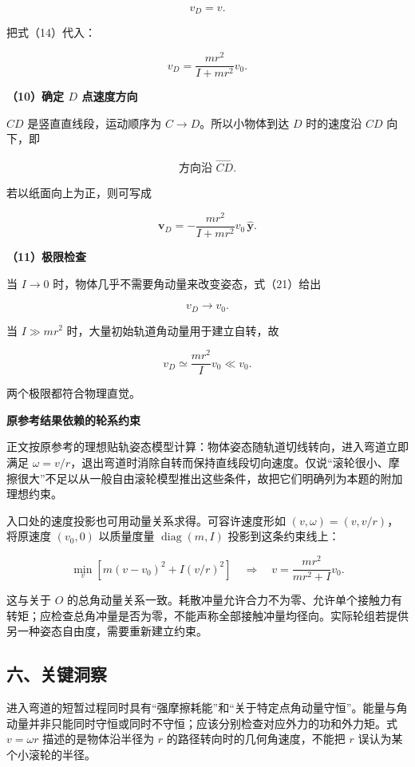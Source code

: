 \documentclass[12pt,a4paper,UTF8]{ctexart}
\begin{document}
\[
v_D=v.
\tag{20}
\]

把式（14）代入：

\[
\boxed{
v_D=\frac{mr^2}{I+mr^2}v_0
}.
\tag{21}
\]

\textbf{（10）确定 \(D\) 点速度方向}

\(CD\) 是竖直直线段，运动顺序为 \(C\to D\)。所以小物体到达 \(D\)
时的速度沿 \(CD\) 向下，即

\[
\boxed{\text{方向沿 }\overrightarrow{CD}}.
\tag{22}
\]

若以纸面向上为正，则可写成

\[
\boxed{
\boldsymbol v_D
=-\frac{mr^2}{I+mr^2}v_0\,\hat{\boldsymbol y}
}.
\tag{23}
\]

\textbf{（11）极限检查}

当 \(I\to0\) 时，物体几乎不需要角动量来改变姿态，式（21）给出

\[
v_D\to v_0.
\]

当 \(I\gg mr^2\) 时，大量初始轨道角动量用于建立自转，故

\[
v_D\simeq\frac{mr^2}{I}v_0\ll v_0.
\]

两个极限都符合物理直觉。

\textbf{原参考结果依赖的轮系约束}

正文按原参考的理想贴轨姿态模型计算：物体姿态随轨道切线转向，进入弯道立即满足
\(\omega=v/r\)，退出弯道时消除自转而保持直线段切向速度。仅说``滚轮很小、摩擦很大''不足以从一般自由滚轮模型推出这些条件，故把它们明确列为本题的附加理想约束。

入口处的速度投影也可用动量关系求得。可容许速度形如
\((v,\omega)=(v,v/r)\)，将原速度 \((v_0,0)\) 以质量度量
\(\operatorname{diag}(m,I)\) 投影到这条约束线上：

\[\min_v\left[m(v-v_0)^2+I(v/r)^2\right]\quad\Rightarrow\quad v=\frac{mr^2}{mr^2+I}v_0.\]

这与关于 \(O\)
的总角动量关系一致。耗散冲量允许合力不为零、允许单个接触力有转矩；应检查总角冲量是否为零，不能声称全部接触冲量均径向。实际轮组若提供另一种姿态自由度，需要重新建立约束。

\subsection{六、关键洞察}\label{ux516dux5173ux952eux6d1eux5bdf-7}

进入弯道的短暂过程同时具有``强摩擦耗能''和``关于特定点角动量守恒''。能量与角动量并非只能同时守恒或同时不守恒；应该分别检查对应外力的功和外力矩。式
\(v=\omega r\) 描述的是物体沿半径为 \(r\)
的路径转向时的几何角速度，不能把 \(r\) 误认为某个小滚轮的半径。
\end{document}
